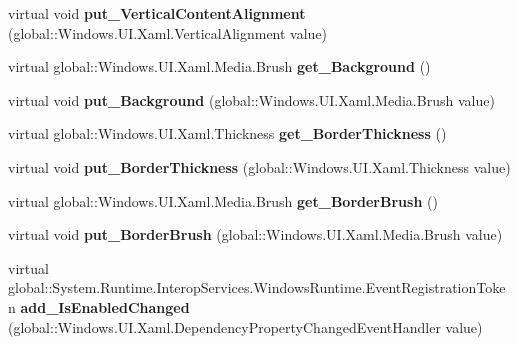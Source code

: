 \begin{DoxyCompactItemize}
virtual void {\bfseries put\+\_\+\+Vertical\+Content\+Alignment} (global\+::\+Windows.\+U\+I.\+Xaml.\+Vertical\+Alignment value)
\item 
\mbox{\label{class_windows_1_1_u_i_1_1_xaml_1_1_controls_1_1_control_a5eb22428eb30c926bcbbdcce65e09678}} 
virtual global\+::\+Windows.\+U\+I.\+Xaml.\+Media.\+Brush {\bfseries get\+\_\+\+Background} ()
\item 
\mbox{\label{class_windows_1_1_u_i_1_1_xaml_1_1_controls_1_1_control_abc00b1110cfb2ca8076ac8356a548d78}} 
virtual void {\bfseries put\+\_\+\+Background} (global\+::\+Windows.\+U\+I.\+Xaml.\+Media.\+Brush value)
\item 
\mbox{\label{class_windows_1_1_u_i_1_1_xaml_1_1_controls_1_1_control_ab76eb28c6756bacca0cc41591940408d}} 
virtual global\+::\+Windows.\+U\+I.\+Xaml.\+Thickness {\bfseries get\+\_\+\+Border\+Thickness} ()
\item 
\mbox{\label{class_windows_1_1_u_i_1_1_xaml_1_1_controls_1_1_control_a4a02a62301b0458bfefc9d7c25b6511e}} 
virtual void {\bfseries put\+\_\+\+Border\+Thickness} (global\+::\+Windows.\+U\+I.\+Xaml.\+Thickness value)
\item 
\mbox{\label{class_windows_1_1_u_i_1_1_xaml_1_1_controls_1_1_control_a71ff5e84affd65e6419e6e3f9a2292b9}} 
virtual global\+::\+Windows.\+U\+I.\+Xaml.\+Media.\+Brush {\bfseries get\+\_\+\+Border\+Brush} ()
\item 
\mbox{\label{class_windows_1_1_u_i_1_1_xaml_1_1_controls_1_1_control_a551a318818f8d5853d61b020af44db11}} 
virtual void {\bfseries put\+\_\+\+Border\+Brush} (global\+::\+Windows.\+U\+I.\+Xaml.\+Media.\+Brush value)
\item 
\mbox{\label{class_windows_1_1_u_i_1_1_xaml_1_1_controls_1_1_control_a825185d5afd2516710efebaeb9350f9d}} 
virtual global\+::\+System.\+Runtime.\+Interop\+Services.\+Windows\+Runtime.\+Event\+Registration\+Token {\bfseries add\+\_\+\+Is\+Enabled\+Changed} (global\+::\+Windows.\+U\+I.\+Xaml.\+Dependency\+Property\+Changed\+Event\+Handler value)

\end{DoxyCompactItemize}
